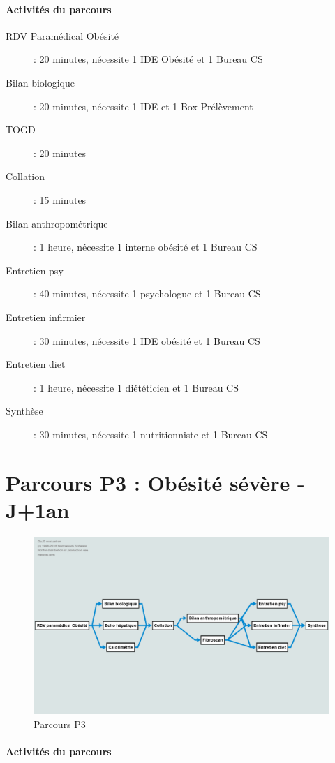 \documentclass[noposter]{polytech/polytech}
\begin{document}
\paragraph{Activités du parcours}

\begin{description}
	\item[RDV Paramédical Obésité]: 20 minutes, nécessite 1 IDE Obésité et 1 Bureau CS
	\item[Bilan biologique]: 20 minutes, nécessite 1 IDE et 1 Box Prélèvement
	\item[TOGD]: 20 minutes
	\item[Collation]: 15 minutes
	\item[Bilan anthropométrique]: 1 heure, nécessite 1 interne obésité et 1 Bureau CS
	\item[Entretien psy]: 40 minutes, nécessite 1 psychologue et 1 Bureau CS
	\item[Entretien infirmier]: 30 minutes, nécessite 1 IDE obésité et 1 Bureau CS
	\item[Entretien diet]: 1 heure, nécessite 1 diététicien et 1 Bureau CS
	\item[Synthèse]: 30 minutes, nécessite 1 nutritionniste et 1 Bureau CS 
\end{description}

\section{Parcours P3 : Obésité sévère - J+1an}

\begin{figure}
	\includegraphics[scale=0.35]{images/parcoursP3}
	\caption{Parcours P3}
	\label{fig:P3}
\end{figure}

\paragraph{Activités du parcours}
\end{document}
